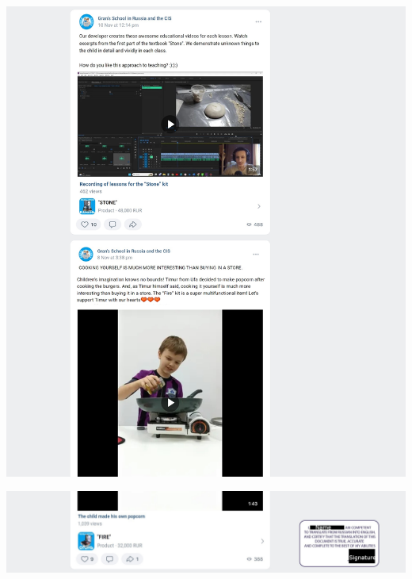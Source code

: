 \Continuing
\begin{center}
    \includegraphics[width=\textwidth]{school-vk_eng-p3}
\end{center}
\WillContinue
\pagebreak

\Continuing
\begin{center}
    \includegraphics[width=\textwidth]{school-vk_eng-p4_public}
\end{center}
\pagebreak

